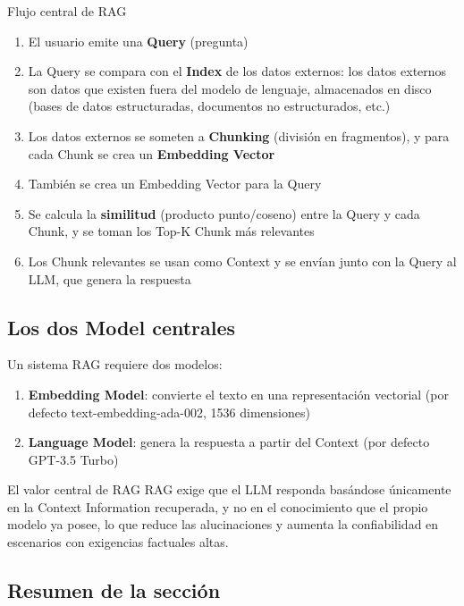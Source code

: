 \documentclass[a4paper]{article}
\begin{document}
\begin{importantbox}{Flujo central de RAG}
\begin{enumerate}
    \item El usuario emite una \textbf{Query} (pregunta)
    \item La Query se compara con el \textbf{Index} de los datos externos: los datos externos son datos que existen fuera del modelo de lenguaje, almacenados en disco (bases de datos estructuradas, documentos no estructurados, etc.)
    \item Los datos externos se someten a \textbf{Chunking} (división en fragmentos), y para cada Chunk se crea un \textbf{Embedding Vector}
    \item También se crea un Embedding Vector para la Query
    \item Se calcula la \textbf{similitud} (producto punto/coseno) entre la Query y cada Chunk, y se toman los Top-K Chunk más relevantes
    \item Los Chunk relevantes se usan como Context y se envían junto con la Query al LLM, que genera la respuesta
\end{enumerate}
\end{importantbox}

\subsection{Los dos Model centrales}

Un sistema RAG requiere dos modelos:
\begin{enumerate}
    \item \textbf{Embedding Model}: convierte el texto en una representación vectorial (por defecto text-embedding-ada-002, 1536 dimensiones)
    \item \textbf{Language Model}: genera la respuesta a partir del Context (por defecto GPT-3.5 Turbo)
\end{enumerate}

\begin{knowledgebox}{El valor central de RAG}
RAG exige que el LLM responda basándose únicamente en la Context Information recuperada, y no en el conocimiento que el propio modelo ya posee, lo que reduce las alucinaciones y aumenta la confiabilidad en escenarios con exigencias factuales altas.
\end{knowledgebox}

\subsection{Resumen de la sección}
\end{document}
